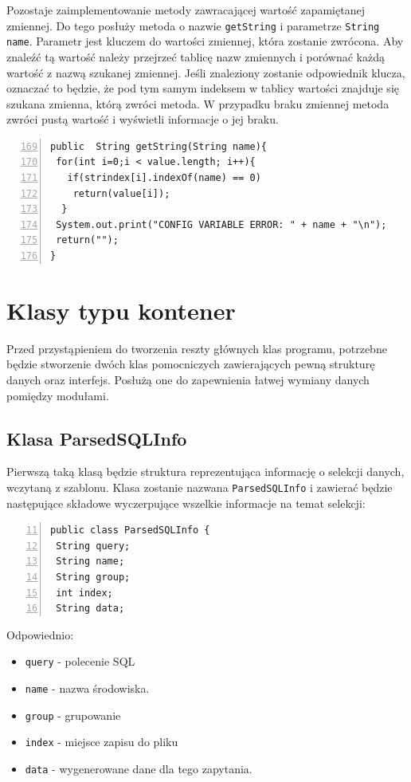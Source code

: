 Pozostaje zaimplementowanie metody zawracającej wartość zapamiętanej zmiennej. Do tego posłuży metoda o nazwie \texttt{getString} i parametrze \texttt{String name}. Parametr jest kluczem do wartości zmiennej, która zostanie zwrócona.  Aby znaleźć tą wartość należy przejrzeć tablicę nazw zmiennych i porównać każdą wartość z nazwą szukanej zmiennej. Jeśli znaleziony zostanie odpowiednik klucza, oznaczać to będzie, że pod tym samym indeksem w tablicy wartości znajduje się szukana zmienna, którą zwróci metoda. W przypadku braku zmiennej metoda zwróci pustą wartość i wyświetli informacje o jej braku.

\begin{lstlisting}[numbers=left,firstnumber=169]
public  String getString(String name){
 for(int i=0;i < value.length; i++){
   if(strindex[i].indexOf(name) == 0)
    return(value[i]);
  }
 System.out.print("CONFIG VARIABLE ERROR: " + name + "\n");
 return("");
}
\end{lstlisting}

\section{Klasy typu kontener}

Przed przystąpieniem do tworzenia reszty głównych klas programu, potrzebne będzie stworzenie dwóch klas pomocniczych zawierających pewną strukturę danych oraz interfejs. Posłużą one do zapewnienia łatwej wymiany danych pomiędzy modułami. 

\subsection{Klasa ParsedSQLInfo}

Pierwszą taką klasą będzie struktura reprezentująca informację o selekcji danych, wczytaną z szablonu. Klasa zostanie nazwana \texttt{ParsedSQLInfo} i zawierać będzie następujące składowe wyczerpujące wszelkie informacje na temat selekcji:

\begin{lstlisting}[numbers=left,firstnumber=11]
public class ParsedSQLInfo {
 String query;
 String name;
 String group;
 int index;
 String data;
\end{lstlisting}
Odpowiednio:
    \begin{itemize}
    \item \texttt{query} - polecenie SQL
    \item \texttt{name} - nazwa środowiska.
    \item \texttt{group} - grupowanie
    \item \texttt{index} - miejsce zapisu do pliku
    \item \texttt{data} - wygenerowane dane dla tego zapytania.
    \end{itemize}

